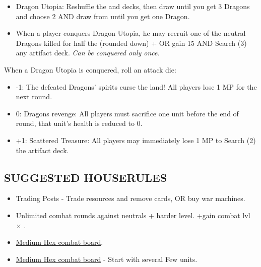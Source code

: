 \begin{multicols*}{2}
\begin{itemize}
  \item Dragon Utopia: Reshuffle the  and decks, then draw  until you get 3 Dragons and choose 2 AND draw from  until you get one Dragon. 
  \item When a player conquers Dragon Utopia, he may recruit one of the neutral Dragons killed for half the  (rounded down) +  OR gain 15  AND Search (3) any artifact deck. \textit{Can be conquered only once.}
\end{itemize}

When a Dragon Utopia is conquered, roll an attack die:
\begin{itemize}
  \item -1: The defeated Dragons’ spirits curse the land! All players lose 1 MP for the next round.
  \item  0: Dragons revenge: All players must sacrifice one unit before the end of round, that unit's health is reduced to 0. 
  \item +1: Scattered Treasure: All players may immediately lose 1 MP to Search (2) the artifact deck.
\end{itemize}

\subsection*{\MakeUppercase{Suggested houserules}}
\begin{itemize}
  \item Trading Posts - Trade resources and remove cards, OR buy war machines.
  \item Unlimited combat rounds against neutrals + harder level. +gain combat lvl × .
  \item \href{https://boardgamegeek.com/thread/3445901/custom-hex-combat-board}{Medium Hex combat board}.
  \item \href{https://boardgamegeek.com/thread/3449937/houserule-for-stacking-more-than-pack}{Medium Hex combat board} - Start with several Few  units.
\end{itemize}

\vspace*{\fill}

\end{multicols*}


